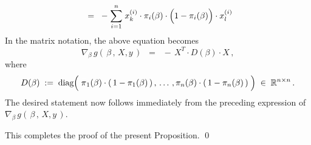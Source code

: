 \begin{enumerate}
\begin{eqnarray*}
	\;\; = \;\;
		-\;\overset{n}{\underset{i=1}{\sum}}\;x^{(i)}_{k}\cdot
		\pi_{i}(\beta)
		\cdot
		\left(1\overset{{\color{white}.}}{-}\pi_{i}(\beta)\right)
		\cdot
		x^{(i)}_{l}
	\end{eqnarray*}
	In the matrix notation, the above equation becomes
	\begin{equation*}
	\nabla_{\beta}\,g(\,\beta\,,\,X,y\,)
	\;\; = \;\;
		-\,X^{T} \cdot D(\beta) \cdot X\,,
	\end{equation*}
	where
	\begin{equation*}
	D(\beta) \; := \; \diag\!\left(\;
		\overset{{\color{white}-}}{\pi}_{1}(\beta) \cdot (\,1-\pi_{1}(\beta)\,)\,,
		\,\ldots\,,
		\pi_{n}(\beta) \cdot (\,1-\pi_{n}(\beta)\,)
		\;\right)
		\;\in\;
		\Re^{n \times n}\,.
	\end{equation*}
	The desired statement now follows immediately from the preceding expression of
	$\nabla_{\beta}\,g(\,\beta\,,\,X,y\,)$.
\end{enumerate}
This completes the proof of the present Proposition.
\qed


\renewcommand{\theenumi}{\roman{enumi}}
\renewcommand{\labelenumi}{\textnormal{(\theenumi)}$\;\;$}

